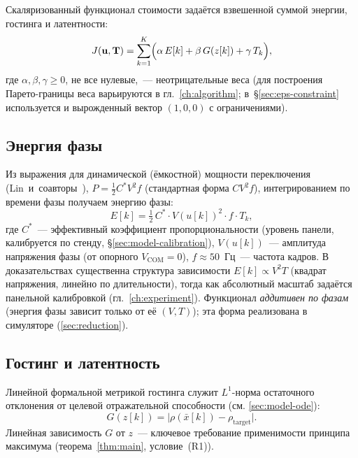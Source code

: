 Скаляризованный функционал стоимости задаётся взвешенной суммой энергии, гостинга
и латентности:
\begin{equation}\label{eq:cost}
    J(\mathbf{u}, \mathbf{T}) = \sum_{k=1}^{K}
        \Bigl(\alpha\, E[k] + \beta\, G(z[k]) + \gamma\, T_k\Bigr),
\end{equation}
где $\alpha, \beta, \gamma \ge 0$, не все нулевые,~--- неотрицательные веса
(для построения Парето-границы веса варьируются в гл.~\ref{ch:algorithm};
в~\S\ref{sec:eps-constraint} используется и вырожденный вектор $(1,0,0)$
с ограничениями).

\subsection*{Энергия фазы}

Из выражения для динамической (ёмкостной) мощности переключения
(Lin~и~соавторы~\cite{lin2024_low_power}), $P = \tfrac12 C^* V^2 f$
(стандартная форма $C V^2 f$), интегрированием по времени фазы получаем
энергию фазы:
\begin{equation}\label{eq:phase-energy}
    E[k] = \tfrac{1}{2}\, C^* \cdot V(u[k])^2 \cdot f \cdot T_k,
\end{equation}
где $C^*$~--- эффективный коэффициент пропорциональности (уровень панели,
калибруется по стенду, \S\ref{sec:model-calibration}), $V(u[k])$~--- амплитуда
напряжения фазы (от опорного $V_{\mathrm{COM}} = 0$), $f \approx 50$~Гц~---
частота кадров. В доказательствах существенна структура зависимости
$E[k]\propto V^2 T$ (квадрат напряжения, линейно по длительности), тогда как
абсолютный масштаб задаётся панельной калибровкой
(гл.~\ref{ch:experiment}). Функционал \emph{аддитивен по фазам} (энергия фазы
зависит только от её $(V, T)$); эта форма реализована в симуляторе
(\ref{sec:reduction}).

\subsection*{Гостинг и латентность}

Линейной формальной метрикой гостинга служит $L^1$-норма остаточного
отклонения от целевой отражательной способности (см. \ref{sec:model-ode}):
\begin{equation}\label{eq:ghost-cost}
    G(z[k]) = \bigl|\rho(\bar{x}[k]) - \rho_{\mathrm{target}}\bigr|.
\end{equation}
Линейная зависимость $G$ от $z$~--- ключевое требование применимости принципа
максимума (теорема~\ref{thm:main}, условие~(R1)).


